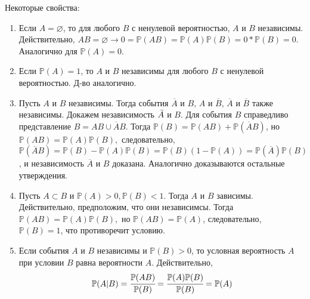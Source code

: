 \documentclass[oneside,final,14pt]{extreport}
\newcommand\myprob[1]{{\mathbb{P}(#1)}}
\theoremstyle{definition}
\begin{document}
Некоторые свойства:
\begin{enumerate} 
    \item Если $A = \varnothing$, то для любого $B$ с ненулевой вероятностью, $A$ и $B$ независимы. Действительно, $AB = \varnothing \rightarrow 0 = \myprob{AB} = \myprob{A}\myprob{B} = 0 * \myprob{B} = 0$. Аналогично для $\myprob{A} = 0$.
    \item Если $\myprob{A} = 1$, то $A$ и $B$ независимы для любого $B$ с ненулевой вероятностью. Д-во аналогично.
    \item Пусть $A$ и $B$ независимы. Тогда события $\overline{A}$ и $B$, $A$ и $\overline{B}$, $\overline{A}$ и $\overline{B}$ также независимы. Докажем независимость $\Bar{A}$ и $B$. Для события $B$ справедливо представление $B = AB \cup \overline{A}B.$ Тогда $\myprob{B} = \myprob{AB} + \myprob{\overline{A}B}$, но $\myprob{AB} = \myprob{A}\myprob{B},$ следовательно, $\myprob{\overline{A}B} = \myprob{B} - \myprob{A}\myprob{B} = \myprob{B} (1 - \myprob{A}) = \myprob{\overline{A}}\myprob{B}$, и независимость $\overline{A}$ и $B$ доказана. Аналогично доказываются остальные утверждения.
    \item Пусть $A \subset B$ и $\myprob{A} > 0, \myprob{B} < 1$. Тогда $A$ и $B$ зависимы. Действительно, предположим, что они независимсы. Тогда $\myprob{AB} = \myprob{A}\myprob{B},$ но $\myprob{AB} = \myprob{A}$, следовательно, $\myprob{B} = 1$, что противоречит условию.
    \item Если события $A$ и $B$ независимы и $\myprob{B} > 0$, то условная вероятность $A$ при условии $B$ равна вероятности $A$. Действительно, 
    \begin{equation*}
        \myprob{A | B} = \cfrac{\myprob{AB}}{\myprob{B}} = \cfrac{\myprob{A}\myprob{B}}{\myprob{B}} = \myprob{A}
    \end{equation*}
\end{enumerate}
\end{document}
